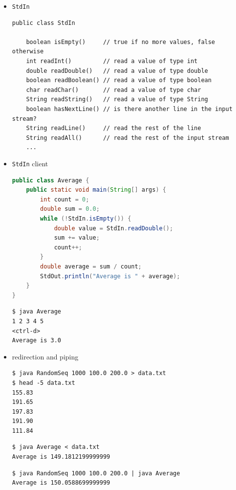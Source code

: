 \documentclass[8pt,a4paper,compress]{beamer}
\begin{document}
\begin{frame}[fragile]
\begin{itemize}
\item \lstinline{StdIn}
\begin{lstlisting}[language={},mathescape]
public class StdIn

    boolean isEmpty()     // true if no more values, false otherwise
    int readInt()         // read a value of type int
    double readDouble()   // read a value of type double
    boolean readBoolean() // read a value of type boolean
    char readChar()       // read a value of type char
    String readString()   // read a value of type String
    boolean hasNextLine() // is there another line in the input stream?
    String readLine()     // read the rest of the line
    String readAll()      // read the rest of the input stream
    ...
\end{lstlisting}

\item \lstinline{StdIn} client
\begin{lstlisting}[language=Java]
public class Average { 
    public static void main(String[] args) { 
        int count = 0; 
        double sum = 0.0;
        while (!StdIn.isEmpty()) {
            double value = StdIn.readDouble();
            sum += value;
            count++;
        }
        double average = sum / count;
        StdOut.println("Average is " + average);
    }
}
\end{lstlisting}

\begin{lstlisting}[language={}]
$ java Average
1 2 3 4 5
<ctrl-d>
Average is 3.0
\end{lstlisting}

\end{itemize}
\end{frame}

\begin{frame}[fragile]
\begin{itemize}
\item redirection and piping
\begin{lstlisting}[language={}]
$ java RandomSeq 1000 100.0 200.0 > data.txt
$ head -5 data.txt
155.83
191.65
197.83
191.90
111.84
\end{lstlisting}

\begin{lstlisting}[language={}]
$ java Average < data.txt
Average is 149.1812199999999
\end{lstlisting}

\begin{lstlisting}[language={}]
$ java RandomSeq 1000 100.0 200.0 | java Average
Average is 150.0588699999999
\end{lstlisting}
\end{itemize}
\end{frame}
\end{document}
